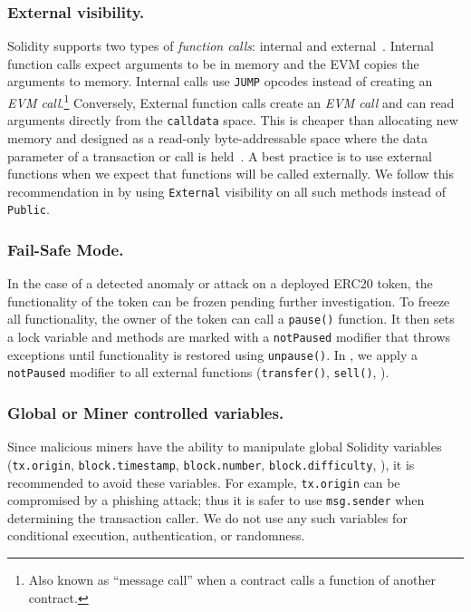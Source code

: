 \subsubsection{External visibility.}

Solidity supports two types of \textit{function calls}: internal and external~\cite{SolidityDoc}. Internal function calls expect arguments to be in memory and the EVM copies the arguments to memory. Internal calls use \texttt{JUMP} opcodes instead of creating an \textit{EVM call}.\footnote{Also known as ``message call'' when a contract calls a function of another contract.} Conversely, External function calls create an \textit{EVM call} and can read arguments directly from the \texttt{calldata} space. This is cheaper than allocating new memory and designed as a read-only byte-addressable space where the data parameter of a transaction or call is held~\cite{EthInDepth}. A best practice is to use external functions when we expect that functions will be called externally. We follow this recommendation in \sys by using \texttt{External} visibility on all such methods instead of \texttt{Public}. 

\subsubsection{Fail-Safe Mode.}

In the case of a detected anomaly or attack on a deployed ERC20 token, the functionality of the token can be frozen pending further investigation. To freeze all functionality, the owner of the token can call a \texttt{pause()} function. It then sets a lock variable and methods are marked with a \texttt{notPaused} modifier that throws exceptions until functionality is restored using \texttt{unpause()}. In \sys, we apply a \texttt{notPaused} modifier to all external functions (\eg \texttt{transfer()}, \texttt{sell()}, \etc).

\subsubsection{Global or Miner controlled variables.}

Since malicious miners have the ability to manipulate global Solidity variables (\eg \texttt{tx.origin}, \texttt{block.timestamp}, \texttt{block.number}, \texttt{block.difficulty}, \etc), it is recommended to avoid these variables. For example, \texttt{tx.origin} can be compromised by a phishing attack; thus it is safer to use \texttt{msg.sender} when determining the transaction caller. We do not use any such variables for conditional execution, authentication, or randomness.

